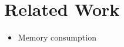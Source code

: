 \section{Related Work}
\begin{itemize}
	\item Memory consumption~\cite{memory_consumption_machine_learning}
\end{itemize}
